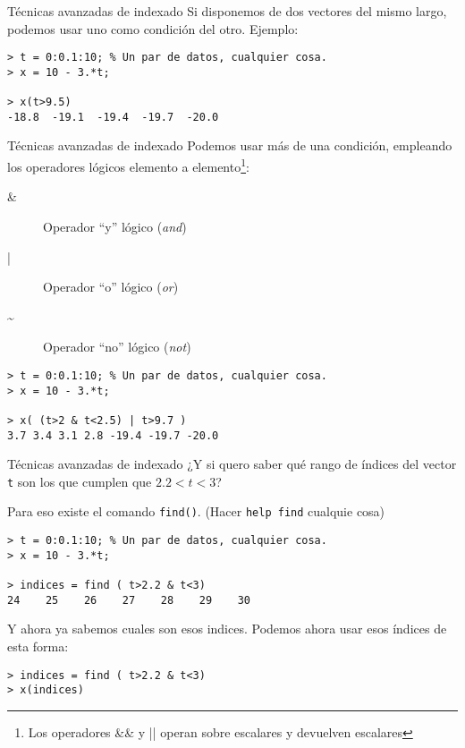 \begin{frame}[fragile]{Técnicas avanzadas de indexado}
Si disponemos de dos vectores del mismo largo, podemos usar uno como condición del otro. Ejemplo:

\begin{lstlisting}
> t = 0:0.1:10; % Un par de datos, cualquier cosa.
> x = 10 - 3.*t;

> x(t>9.5)
-18.8  -19.1  -19.4  -19.7  -20.0
\end{lstlisting}

\end{frame}

\begin{frame}[fragile]{Técnicas avanzadas de indexado}
Podemos usar más de una condición, empleando los operadores lógicos elemento a elemento\footnote{Los operadores \&\& y || operan sobre escalares y devuelven escalares}:

\begin{description}
\item[\&] Operador ``y'' lógico (\textit{and})
\item[|] Operador ``o'' lógico (\textit{or})
\item[\textasciitilde] Operador ``no'' lógico (\textit{not})
\end{description}


\begin{lstlisting}
> t = 0:0.1:10; % Un par de datos, cualquier cosa.
> x = 10 - 3.*t;

> x( (t>2 & t<2.5) | t>9.7 )
3.7 3.4 3.1 2.8 -19.4 -19.7 -20.0
\end{lstlisting}

\end{frame}

\begin{frame}[fragile]{Técnicas avanzadas de indexado}
¿Y si quero saber qué rango de índices del vector \verb!t! son los que cumplen que $2.2<t<3$?

Para eso existe el comando \verb!find()!. (Hacer \verb!help find! cualquie cosa)

\begin{lstlisting}
> t = 0:0.1:10; % Un par de datos, cualquier cosa.
> x = 10 - 3.*t;

> indices = find ( t>2.2 & t<3)
24    25    26    27    28    29    30
\end{lstlisting}

Y ahora ya sabemos cuales son esos indices. Podemos ahora usar esos índices de esta forma:

\begin{lstlisting}
> indices = find ( t>2.2 & t<3)
> x(indices)
\end{lstlisting}

\end{frame}

